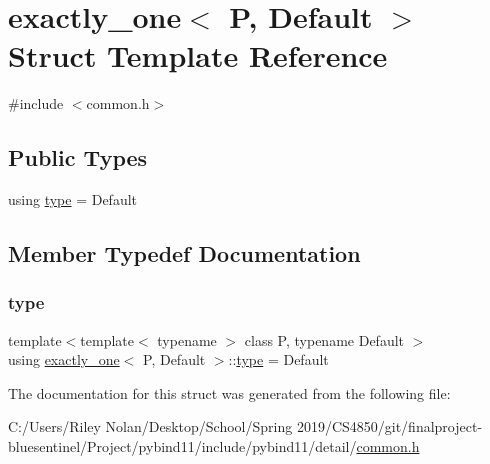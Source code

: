 \hypertarget{structexactly__one_3_01_p_00_01_default_01_4}{}\section{exactly\+\_\+one$<$ P, Default $>$ Struct Template Reference}
\label{structexactly__one_3_01_p_00_01_default_01_4}


{\ttfamily \#include $<$common.\+h$>$}

\subsection*{Public Types}
\begin{DoxyCompactItemize}
\item 
using \mbox{\hyperlink{structexactly__one_3_01_p_00_01_default_01_4_a4cd8cb6e1e88ee35a595632dc97aadbf}{type}} = Default
\end{DoxyCompactItemize}


\subsection{Member Typedef Documentation}
\mbox{\label{structexactly__one_3_01_p_00_01_default_01_4_a4cd8cb6e1e88ee35a595632dc97aadbf}} 
\subsubsection{\texorpdfstring{type}{type}}
{\footnotesize\ttfamily template$<$template$<$ typename $>$ class P, typename Default $>$ \\
using \mbox{\hyperlink{structexactly__one}{exactly\+\_\+one}}$<$ P, Default $>$\+::\mbox{\hyperlink{structexactly__one_3_01_p_00_01_default_01_4_a4cd8cb6e1e88ee35a595632dc97aadbf}{type}} =  Default}



The documentation for this struct was generated from the following file\+:\begin{DoxyCompactItemize}
\item 
C\+:/\+Users/\+Riley Nolan/\+Desktop/\+School/\+Spring 2019/\+C\+S4850/git/finalproject-\/bluesentinel/\+Project/pybind11/include/pybind11/detail/\mbox{\hyperlink{detail_2common_8h}{common.\+h}}\end{DoxyCompactItemize}
